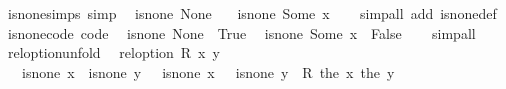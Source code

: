 \begin{isabellebody}
\isanewline
{}\isamarkupfalse%
\ is{\isacharunderscore}{\kern0pt}none{\isacharunderscore}{\kern0pt}simps\ {\isacharbrackleft}{\kern0pt}simp{\isacharbrackright}{\kern0pt}{\isacharcolon}{\kern0pt}\isanewline
\ \ {\isachardoublequoteopen}is{\isacharunderscore}{\kern0pt}none\ None{\isachardoublequoteclose}\isanewline
\ \ {\isachardoublequoteopen}{\isasymnot}\ is{\isacharunderscore}{\kern0pt}none\ {\isacharparenleft}{\kern0pt}Some\ x{\isacharparenright}{\kern0pt}{\isachardoublequoteclose}\isanewline
%
\isadelimproof
\ \ %
\endisadelimproof
%
\isatagproof
{}\isamarkupfalse%
\ {\isacharparenleft}{\kern0pt}simp{\isacharunderscore}{\kern0pt}all\ add{\isacharcolon}{\kern0pt}\ is{\isacharunderscore}{\kern0pt}none{\isacharunderscore}{\kern0pt}def{\isacharparenright}{\kern0pt}%
\endisatagproof
{\isafoldproof}%
%
\isadelimproof
\isanewline
%
\endisadelimproof
\isanewline
{}\isamarkupfalse%
\ is{\isacharunderscore}{\kern0pt}none{\isacharunderscore}{\kern0pt}code\ {\isacharbrackleft}{\kern0pt}code{\isacharbrackright}{\kern0pt}{\isacharcolon}{\kern0pt}\isanewline
\ \ {\isachardoublequoteopen}is{\isacharunderscore}{\kern0pt}none\ None\ {\isacharequal}{\kern0pt}\ True{\isachardoublequoteclose}\isanewline
\ \ {\isachardoublequoteopen}is{\isacharunderscore}{\kern0pt}none\ {\isacharparenleft}{\kern0pt}Some\ x{\isacharparenright}{\kern0pt}\ {\isacharequal}{\kern0pt}\ False{\isachardoublequoteclose}\isanewline
%
\isadelimproof
\ \ %
\endisadelimproof
%
\isatagproof
{}\isamarkupfalse%
\ simp{\isacharunderscore}{\kern0pt}all%
\endisatagproof
{\isafoldproof}%
%
\isadelimproof
\isanewline
%
\endisadelimproof
\isanewline
{}\isamarkupfalse%
\ rel{\isacharunderscore}{\kern0pt}option{\isacharunderscore}{\kern0pt}unfold{\isacharcolon}{\kern0pt}\isanewline
\ \ {\isachardoublequoteopen}rel{\isacharunderscore}{\kern0pt}option\ R\ x\ y\ {\isasymlongleftrightarrow}\isanewline
\ \ \ {\isacharparenleft}{\kern0pt}is{\isacharunderscore}{\kern0pt}none\ x\ {\isasymlongleftrightarrow}\ is{\isacharunderscore}{\kern0pt}none\ y{\isacharparenright}{\kern0pt}\ {\isasymand}\ {\isacharparenleft}{\kern0pt}{\isasymnot}\ is{\isacharunderscore}{\kern0pt}none\ x\ {\isasymlongrightarrow}\ {\isasymnot}\ is{\isacharunderscore}{\kern0pt}none\ y\ {\isasymlongrightarrow}\ R\ {\isacharparenleft}{\kern0pt}the\ x{\isacharparenright}{\kern0pt}\ {\isacharparenleft}{\kern0pt}the\ y{\isacharparenright}{\kern0pt}{\isacharparenright}{\kern0pt}{\isachardoublequoteclose}\isanewline
%
\isadelimproof
\ \ %
\endisadelimproof
%
\isatagproof
{}\isamarkupfalse%

\end{isabellebody}
